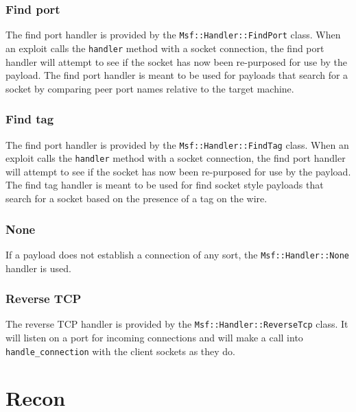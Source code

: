\documentclass{report}
\begin{document}
            \subsubsection{Find port}

\par
The find port handler is provided by the
\texttt{Msf::Handler::FindPort} class.  When an exploit calls the
\texttt{handler} method with a socket connection, the find port
handler will attempt to see if the socket has now been re-purposed
for use by the payload.  The find port handler is meant to be used
for payloads that search for a socket by comparing peer port names
relative to the target machine.

            \subsubsection{Find tag}

\par
The find port handler is provided by the
\texttt{Msf::Handler::FindTag} class.  When an exploit calls the
\texttt{handler} method with a socket connection, the find port
handler will attempt to see if the socket has now been re-purposed
for use by the payload.  The find tag handler is meant to be used
for find socket style payloads that search for a socket based on the
presence of a tag on the wire.

            \subsubsection{None}

\par
If a payload does not establish a connection of any sort, the
\texttt{Msf::Handler::None} handler is used.

            \subsubsection{Reverse TCP}

\par
The reverse TCP handler is provided by the
\texttt{Msf::Handler::ReverseTcp} class.  It will listen on a port
for incoming connections and will make a call into
\texttt{handle\_connection} with the client sockets as they do.

    \section{Recon}
\end{document}
